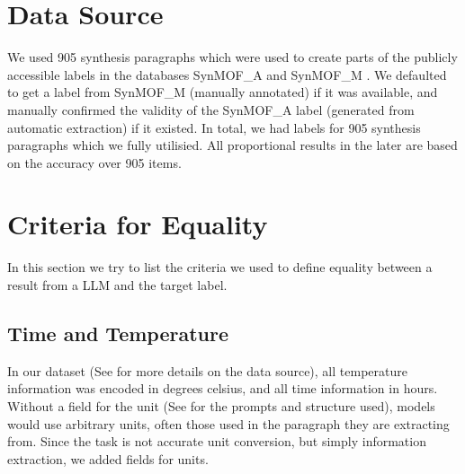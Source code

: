 


\section{Data Source}\label{sec:data}
We used 905 synthesis paragraphs which were used to create parts of the publicly accessible labels in the databases SynMOF\_A and SynMOF\_M \cite{luo_mof_2022}.
We defaulted to get a label from SynMOF\_M (manually annotated) if it was available, and manually confirmed the validity of the SynMOF\_A label (generated from automatic extraction) if it existed.
In total, we had labels for 905 synthesis paragraphs which we fully utilisied.
All proportional results in the later  are based on the accuracy over 905 items.

\section{Criteria for Equality}\label{sec:equality}
In this section we try to list the criteria we used to define equality between a result from a \gls{LLM} and the target label.

\subsection{Time and Temperature}\label{sub:ttunit}
In our dataset (See  for more details on the data source), all temperature information was encoded in degrees celsius, and all time information in hours.
Without a field for the unit (See  for the prompts and structure used), models would use arbitrary units, often those used in the paragraph they are extracting from.
Since the task is not accurate unit conversion, but simply information extraction, we added fields for units.

